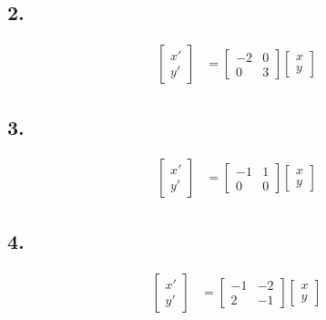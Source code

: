 \subsection*{2. }
\begin{align*}
	\begin{bmatrix}
	x' \\ y'
	\end{bmatrix}
	&=
	\begin{bmatrix}
	-2 & 0 \\ 0 & 3
	\end{bmatrix}
	\begin{bmatrix}
	x \\ y
	\end{bmatrix}
\end{align*}

\subsection*{3. }
\begin{align*}
	\begin{bmatrix}
	x' \\ y'
	\end{bmatrix}
	&=
	\begin{bmatrix}
	-1 & 1 \\ 0 & 0
	\end{bmatrix}
	\begin{bmatrix}
	x \\ y
	\end{bmatrix}
\end{align*}

\subsection*{4. }
\begin{align*}
	\begin{bmatrix}
	x' \\ y'
	\end{bmatrix}
	&=
	\begin{bmatrix}
	-1 & -2 \\ 2 & -1
	\end{bmatrix}
	\begin{bmatrix}
	x \\ y
	\end{bmatrix}
\end{align*}




